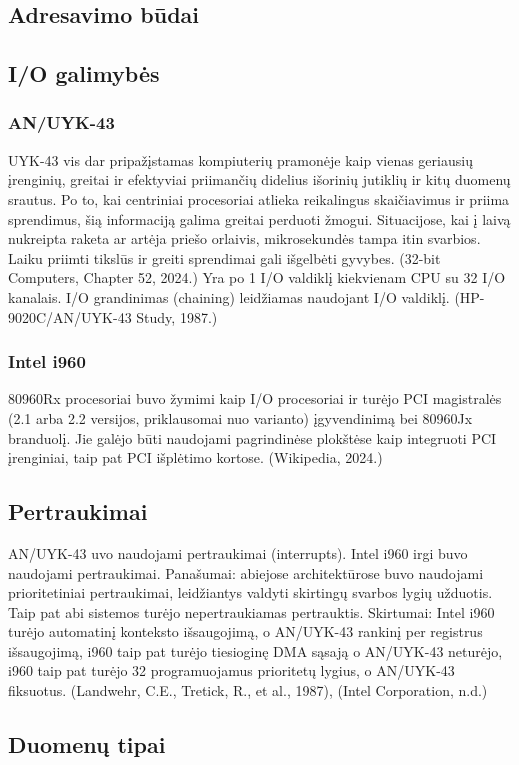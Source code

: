 \documentclass{article}
\begin{document}
\subsection{Adresavimo būdai}

\subsection{I/O galimybės}
\subsubsection{AN/UYK-43}
UYK-43 vis dar pripažįstamas kompiuterių pramonėje kaip vienas geriausių įrenginių, greitai ir efektyviai priimančių didelius išorinių jutiklių ir kitų duomenų srautus. Po to, kai centriniai procesoriai atlieka reikalingus skaičiavimus ir priima sprendimus, šią informaciją galima greitai perduoti žmogui. Situacijose, kai į laivą nukreipta raketa ar artėja priešo orlaivis, mikrosekundės tampa itin svarbios. Laiku priimti tikslūs ir greiti sprendimai gali išgelbėti gyvybes. (32-bit Computers, Chapter 52, 2024.) Yra  po 1 I/O valdiklį kiekvienam CPU su 32 I/O kanalais. I/O grandinimas (chaining) leidžiamas naudojant I/O valdiklį. (HP-9020C/AN/UYK-43 Study, 1987.)
\subsubsection{Intel i960}
80960Rx procesoriai buvo žymimi kaip I/O procesoriai ir turėjo PCI magistralės (2.1 arba 2.2 versijos, priklausomai nuo varianto) įgyvendinimą bei 80960Jx branduolį. Jie galėjo būti naudojami pagrindinėse plokštėse kaip integruoti PCI įrenginiai, taip pat PCI išplėtimo kortose. (Wikipedia, 2024.)
\subsection{Pertraukimai}
AN/UYK-43 uvo naudojami pertraukimai (interrupts). Intel i960 irgi buvo naudojami pertraukimai. Panašumai: abiejose architektūrose buvo naudojami prioritetiniai pertraukimai, leidžiantys valdyti skirtingų svarbos lygių užduotis. Taip pat abi sistemos turėjo nepertraukiamas pertrauktis. Skirtumai: Intel i960 turėjo automatinį konteksto išsaugojimą, o AN/UYK-43 rankinį per registrus išsaugojimą, i960 taip pat turėjo tiesioginę DMA sąsają o AN/UYK-43 neturėjo, i960 taip pat turėjo 32 programuojamus prioritetų lygius, o AN/UYK-43 fiksuotus. (Landwehr, C.E., Tretick, R., et al., 1987), (Intel Corporation, n.d.)
\subsection{Duomenų tipai}
\end{document}
